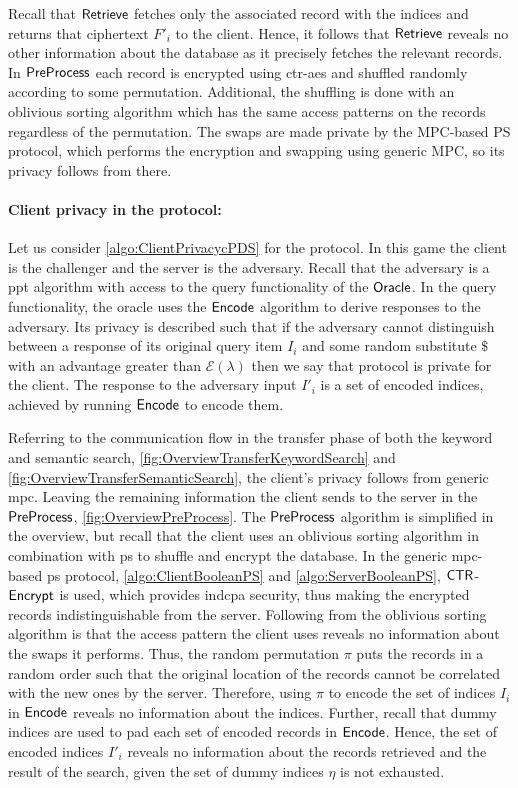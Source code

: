 Recall that $ \mathsf{{Retrieve}} $ fetches only the associated record with the indices and returns that ciphertext $ F'_i $ to the client. Hence, it follows that $ \mathsf{{Retrieve}} $ reveals no other information about the database as it precisely fetches the relevant records. In $ \mathsf{{PreProcess}} $ each record is encrypted using \acrshort{ctr}-\acrshort{aes} and shuffled randomly according to some permutation. Additional, the shuffling is done with an oblivious sorting algorithm which has the same access patterns on the records regardless of the permutation. The swaps are made private by the MPC-based PS protocol, which performs the encryption and swapping using generic MPC, so its privacy follows from there.

\paragraph*{Client privacy in the protocol:} Let us consider \cref{algo:ClientPrivacycPDS} for the protocol. In this game the client is the challenger and the server is the adversary. Recall that the adversary is a \acrshort{ppt} algorithm with access to the query functionality of the $ \mathsf{{Oracle}} $. In the query functionality, the oracle uses the $ \mathsf{{Encode}} $ algorithm to derive responses to the adversary. Its privacy is described such that if the adversary cannot distinguish between a response of its original query item $ I_i $ and some random substitute $ \$ $ with an advantage greater than $ \mathcal{E} \left( \lambda \right) $ then we say that protocol is private for the client. The response to the adversary input $ I'_i $ is a set of encoded indices, achieved by running $ \mathsf{{Encode}} $ to encode them.

Referring to the communication flow in the transfer phase of both the keyword and semantic search, \cref{fig:OverviewTransferKeywordSearch} and \cref{fig:OverviewTransferSemanticSearch}, the client's privacy follows from generic \acrshort{mpc}. Leaving the remaining information the client sends to the server in the $ \mathsf{{PreProcess}} $, \cref{fig:OverviewPreProcess}. The $ \mathsf{{PreProcess}} $ algorithm is simplified in the overview, but recall that the client uses an oblivious sorting algorithm in combination with \acrshort{ps} to shuffle and encrypt the database. In the generic \acrshort{mpc}-based \acrshort{ps} protocol, \cref{algo:ClientBooleanPS} and \cref{algo:ServerBooleanPS}, $\mathsf{{CTR}} $-$ \mathsf{{Encrypt}}$ is used, which provides \acrshort{indcpa} security, thus making the encrypted records indistinguishable from the server. Following from the oblivious sorting algorithm is that the access pattern the client uses reveals no information about the swaps it performs. Thus, the random permutation $ \pi $ puts the records in a random order such that the original location of the records cannot be correlated with the new ones by the server. Therefore, using $ \pi $ to encode the set of indices $ I_i $ in $ \mathsf{{Encode}} $ reveals no information about the indices. Further, recall that dummy indices are used to pad each set of encoded records in $ \mathsf{{Encode}} $. Hence, the set of encoded indices $ I'_i $ reveals no information about the records retrieved and the result of the search, given the set of dummy indices $ \eta $ is not exhausted.


